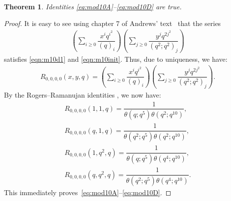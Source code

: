 \documentclass[10pt]{article}
\newtheorem{thm}{Theorem}[section]
\begin{document}
\begin{thm}
Identities \eqref{eq:mod10A}--\eqref{eq:mod10D} are true.
\end{thm}
\begin{proof}
It is easy to see using chapter 7 of Andrews' text~\cite{And-book} that 
the series  
\begin{align}
\left(\sum_{i\geq 0} \dfrac{x^iq^{i^2}}{(q)_i}\right)
\left(\sum_{j\geq 0} \dfrac{y^jq^{2j^2}}{(q^2;q^2)_j}\right)
\end{align}
satisfies \eqref{eqn:m10d1} and \eqref{eqn:m10init}.
Thus, due to uniqueness, we have:
\begin{align}
R_{0,0,0,0}(x,y,q)=\left(\sum_{i\geq 0} \dfrac{x^iq^{i^2}}{(q)_i}\right)
\left(\sum_{j\geq 0} \dfrac{y^jq^{2j^2}}{(q^2;q^2)_j}\right).
\end{align}
By the Rogers--Ramanujan identities \cite[Ch.\ 7]{And-book}, we now have:
\begin{align}
R_{0,0,0,0}(1,1,q)=\dfrac{1}{\theta(q;q^5)\theta(q^2;q^{10})},\\
R_{0,0,0,0}(q,1,q)=\dfrac{1}{\theta(q^2;q^5)\theta(q^2;q^{10})},\\
R_{0,0,0,0}(1,q^2,q)=\dfrac{1}{\theta(q;q^5)\theta(q^4;q^{10})},\\
R_{0,0,0,0}(q,q^2,q)=\dfrac{1}{\theta(q^2;q^5)\theta(q^4;q^{10})}.
\end{align}
This immediately proves~\eqref{eq:mod10A}--\eqref{eq:mod10D}.
\end{proof}
\end{document}
